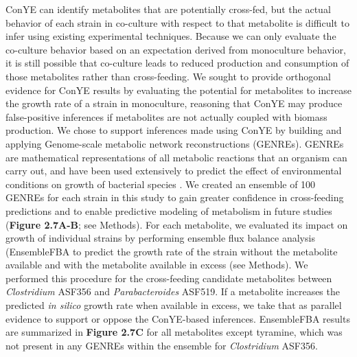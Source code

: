 \documentclass[11pt,twocolumn,notitlepage,openany,twoside]{book}
\begin{document}
\begin{refsection}
ConYE can identify metabolites that are potentially cross-fed, but the actual behavior of each strain in co-culture with respect to that metabolite is difficult to infer using existing experimental techniques. Because we can only evaluate the co-culture behavior based on an expectation derived from monoculture behavior, it is still possible that co-culture leads to reduced production and consumption of those metabolites rather than cross-feeding. We sought to provide orthogonal evidence for ConYE results by evaluating the potential for metabolites to increase the growth rate of a strain in monoculture, reasoning that ConYE may produce false-positive inferences if metabolites are not actually coupled with biomass production. We chose to support inferences made using ConYE by building and applying Genome-scale metabolic network reconstructions (GENREs). GENREs are mathematical representations of all metabolic reactions that an organism can carry out, and have been used extensively to predict the effect of environmental conditions on growth of bacterial species \cite{Oberhardt2009-iu}. We created an ensemble of 100 GENREs for each strain in this study to gain greater confidence in cross-feeding predictions and to enable predictive modeling of metabolism in future studies (\textbf{Figure 2.7A-B}; see Methods). For each metabolite, we evaluated its impact on growth of individual strains by performing ensemble flux balance analysis (EnsembleFBA \cite{Biggs2017-md} to predict the growth rate of the strain without the metabolite available and with the metabolite available in excess (see Methods). We performed this procedure for the cross-feeding candidate metabolites between \textit{Clostridium} ASF356 and \textit{Parabacteroides} ASF519. If a metabolite increases the predicted \textit{in silico} growth rate when available in excess, we take that as parallel evidence to support or oppose the ConYE-based inferences. EnsembleFBA results are summarized in \textbf{Figure 2.7C} for all metabolites except tyramine, which was not present in any GENREs within the ensemble for \textit{Clostridium} ASF356.


\end{refsection}
\end{document}
